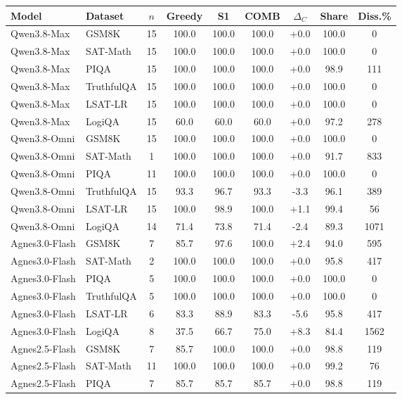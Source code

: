 \scriptsize
\begin{tabular*}{\columnwidth}{@{\extracolsep{\fill}} l l c c c c c c c}
\toprule
Model & Dataset & $n$ & Greedy & S1 & COMB & $\Delta_C$ & Share & Diss.\% \\
\midrule
Qwen3.8-Max & GSM8K & 15 & 100.0 & 100.0 & 100.0 & +0.0 & 100.0 & 0 \\
Qwen3.8-Max & SAT-Math & 15 & 100.0 & 100.0 & 100.0 & +0.0 & 100.0 & 0 \\
Qwen3.8-Max & PIQA & 15 & 100.0 & 100.0 & 100.0 & +0.0 & 98.9 & 111 \\
Qwen3.8-Max & TruthfulQA & 15 & 100.0 & 100.0 & 100.0 & +0.0 & 100.0 & 0 \\
Qwen3.8-Max & LSAT-LR & 15 & 100.0 & 100.0 & 100.0 & +0.0 & 100.0 & 0 \\
Qwen3.8-Max & LogiQA & 15 & 60.0 & 60.0 & 60.0 & +0.0 & 97.2 & 278 \\
\midrule
Qwen3.8-Omni & GSM8K & 15 & 100.0 & 100.0 & 100.0 & +0.0 & 100.0 & 0 \\
Qwen3.8-Omni & SAT-Math & 1 & 100.0 & 100.0 & 100.0 & +0.0 & 91.7 & 833 \\
Qwen3.8-Omni & PIQA & 11 & 100.0 & 100.0 & 100.0 & +0.0 & 100.0 & 0 \\
Qwen3.8-Omni & TruthfulQA & 15 & 93.3 & 96.7 & 93.3 & -3.3 & 96.1 & 389 \\
Qwen3.8-Omni & LSAT-LR & 15 & 100.0 & 98.9 & 100.0 & +1.1 & 99.4 & 56 \\
Qwen3.8-Omni & LogiQA & 14 & 71.4 & 73.8 & 71.4 & -2.4 & 89.3 & 1071 \\
\midrule
Agnes3.0-Flash & GSM8K & 7 & 85.7 & 97.6 & 100.0 & +2.4 & 94.0 & 595 \\
Agnes3.0-Flash & SAT-Math & 2 & 100.0 & 100.0 & 100.0 & +0.0 & 95.8 & 417 \\
Agnes3.0-Flash & PIQA & 5 & 100.0 & 100.0 & 100.0 & +0.0 & 100.0 & 0 \\
Agnes3.0-Flash & TruthfulQA & 5 & 100.0 & 100.0 & 100.0 & +0.0 & 100.0 & 0 \\
Agnes3.0-Flash & LSAT-LR & 6 & 83.3 & 88.9 & 83.3 & -5.6 & 95.8 & 417 \\
Agnes3.0-Flash & LogiQA & 8 & 37.5 & 66.7 & 75.0 & +8.3 & 84.4 & 1562 \\
\midrule
Agnes2.5-Flash & GSM8K & 7 & 85.7 & 100.0 & 100.0 & +0.0 & 98.8 & 119 \\
Agnes2.5-Flash & SAT-Math & 11 & 100.0 & 100.0 & 100.0 & +0.0 & 99.2 & 76 \\
Agnes2.5-Flash & PIQA & 7 & 85.7 & 85.7 & 85.7 & +0.0 & 98.8 & 119 \\

\end{tabular*}
